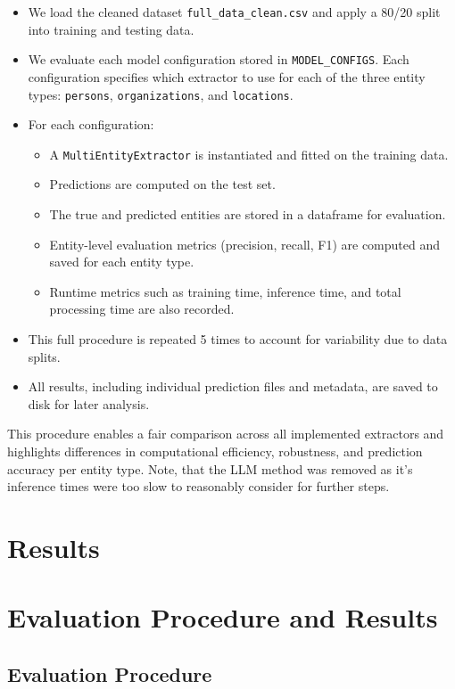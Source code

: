 \begin{itemize}
  \item We load the cleaned dataset \texttt{full\_data\_clean.csv} and apply a 80/20 split into training and testing data.
  \item We evaluate each model configuration stored in \texttt{MODEL\_CONFIGS}. Each configuration specifies which extractor to use for each of the three entity types: \texttt{persons}, \texttt{organizations}, and \texttt{locations}.
  \item For each configuration:
  \begin{itemize}
    \item A \texttt{MultiEntityExtractor} is instantiated and fitted on the training data.
    \item Predictions are computed on the test set.
    \item The true and predicted entities are stored in a dataframe for evaluation.
    \item Entity-level evaluation metrics (precision, recall, F1) are computed and saved for each entity type.
    \item Runtime metrics such as training time, inference time, and total processing time are also recorded.
  \end{itemize}
  \item This full procedure is repeated 5 times to account for variability due to data splits.
  \item All results, including individual prediction files and metadata, are saved to disk for later analysis.
\end{itemize}

This procedure enables a fair comparison across all implemented extractors and highlights differences in computational efficiency, robustness, and prediction accuracy per entity type. Note, that the LLM method was removed as it's inference times were too slow to reasonably consider for further steps. 

\section{Results}
\section{Evaluation Procedure and Results}

\subsection{Evaluation Procedure}

